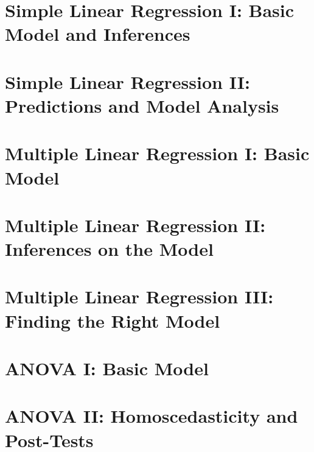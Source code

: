 \documentclass[11pt,a4paper]{article}
\begin{document}
\section{Simple Linear Regression I: Basic Model and Inferences}
\section{Simple Linear Regression II: Predictions and Model Analysis}
\section{Multiple Linear Regression I: Basic Model}
\section{Multiple Linear Regression II: Inferences on the Model}
\section{Multiple Linear Regression III: Finding the Right Model}
\section{ANOVA I: Basic Model}
\section{ANOVA II: Homoscedasticity and Post-Tests}
\end{document}

